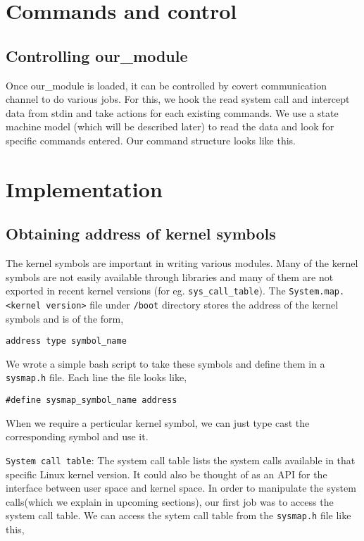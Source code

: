 \documentclass[10pt, letterpaper]{scrartcl}
\begin{document}
\section{Commands and control}
    \subsection{Controlling our\_module}
    Once our\_module is loaded, it can be controlled by covert communication channel to do various jobs. 
For this, we hook the read system call and intercept data from stdin and take actions for each existing  commands. 
We use a state machine model (which will be described later) to read the data and look for specific commands entered. 
Our command structure looks like this.

\section{Implementation}

\subsection{Obtaining address of kernel symbols}
The kernel symbols are important in writing various modules. Many of the kernel symbols are not easily available through libraries 
and many of them are not exported in recent kernel versions (for eg. \texttt{sys\_call\_table}).
The \texttt{System.map.<kernel version>} file under \texttt{/boot} directory stores the address of the kernel symbols and is of the form, 
\begin{verbatim}
address type symbol_name
\end{verbatim}

We wrote a simple bash script to take these symbols and define them in a \texttt{sysmap.h} file. 
Each line the file looks like, 

\begin{verbatim}
#define sysmap_symbol_name address
\end{verbatim}

When we require a perticular kernel symbol, we can just type cast the corresponding symbol and use it. 

\texttt{System call table}: The system call table lists the system calls available in that specific Linux kernel version. 
It could also be thought of as an API for the interface between user space and kernel space. 
In order to manipulate the system calls(which we explain in upcoming sections), our first job was to access the system call table.
We can access the sytem call table from the \texttt{sysmap.h} file like this,
\end{document}
